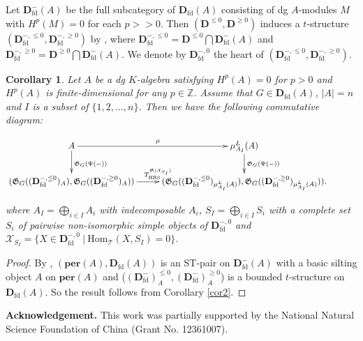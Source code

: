 \documentclass[11pt,a4paper]{amsart}
\numberwithin{equation}{section} \theoremstyle{plain}
\newtheorem{cor}[lem]{Corollary}
\numberwithin{equation}{section} \theoremstyle{definition}
\begin{document}
Let $\mathbf{D}^{-}_{\mathrm{fd}}(A)$ be the full subcategory of $\mathbf{D}_{\mathrm{fd}}(A)$ consisting of dg $A$-modules $M$ with $H^{p}(M)=0$ for each $p>>0$. Then $(\mathbf{D}^{\leq0},\mathbf{D}^{\geq0})$ induces a $t$-structure $(\mathbf{D}_{\mathrm{fd}}^{-,\leq0},\mathbf{D}_{\mathrm{fd}}^{-,\geq0})$ by \cite[3.1.19]{BBD}, where $\mathbf{D}_{\mathrm{fd}}^{-,\leq0}=\mathbf{D}^{\leq0}\bigcap\mathbf{D}^{-}_{\mathrm{fd}}(A)$ and $\mathbf{D}_{\mathrm{fd}}^{-,\geq0}=\mathbf{D}^{\geq0}\bigcap\mathbf{D}^{-}_{\mathrm{fd}}(A)$. We denote by $\mathbf{D}_{\mathrm{fd}}^{-,0}$ the heart of $(\mathbf{D}_{\mathrm{fd}}^{-,\leq0},\mathbf{D}_{\mathrm{fd}}^{-,\geq0})$.



\begin{cor}\label{cor3} Let $A$ be a dg $K$-algebra satisfying $H^{p}(A)=0$ for $p>0$ and $H^{p}(A)$ is finite-dimensional for any $p\in\mathbb{Z}$. Assume that $G\in\mathbf{D}_{\mathrm{fd}}(A)$, $|A|=n$ and $I$ is a subset of $\{1,2,\ldots,n\}$. Then we have the following commutative diagram:
\begin{center} $\xymatrix@C=25pt@R=20pt{
A\ar[d]^{\mathfrak{G}_{G}(\Psi(-))}\ar[r]^{\mu} &\mu_{A_{I}}^{L}(A)\ar[d]^{\mathfrak{G}_{G}(\Psi(-))}&\\
(\mathfrak{G}_{G}((\mathbf{D}_{\mathrm{fd}}^{-,\leq0})_{A}),\mathfrak{G}_{G}((\mathbf{D}_{\mathrm{fd}}^{-,\geq0})_{A}))\ar[r]^{T_{\mathrm{HRS}}^{\mathfrak{G}(\mathcal{X}_{S_{I}})}}& (\mathfrak{G}_{G}((\mathbf{D}_{\mathrm{fd}}^{-,\leq0})_{\mu_{A_{I}}^{L}(A)}),\mathfrak{G}_{G}((\mathbf{D}_{\mathrm{fd}}^{-,\geq0})_{\mu_{A_{I}}^{L}(A)})).&}$
\end{center}
where $A_{I}=\bigoplus_{i\in I}A_{i}$ with indecomposable $A_{i}$, $S_{I}=\bigoplus_{i\in I}S_{i}$ with a complete set $S_{i}$ of pairwise non-isomorphic simple objects of $\mathbf{D}_{\mathrm{fd}}^{-,0}$ and $\mathcal{X}_{S_{I}}=\{X\in\mathbf{D}_{\mathrm{fd}}^{-,0}~|~\mathrm{Hom}_{\mathcal{T}}(X,S_{I})=0\}$.
\end{cor}
\begin{proof} By \cite[Proposition 6.12]{AMY}, $(\mathbf{per}(A),\mathbf{D}_{\mathrm{fd}}(A))$ is an ST-pair on $\mathbf{D}^{-}_{\mathrm{fd}}(A)$ with a basic silting object $A$ on $\mathbf{per}(A)$ and ($(\mathbf{D}_{\mathrm{fd}}^{-})_{A}^{\leq0},(\mathbf{D}_{\mathrm{fd}}^{-})_{A}^{\geq0}$) is a bounded $t$-structure on $\mathbf{D}_{\mathrm{fd}}(A)$. So the result follows from Corollary \ref{cor2}.
\end{proof}


\bigskip
{\bf Acknowledgement.}
This work was partially supported by the National Natural Science Foundation of China (Grant No. 12361007).
\end{document}
